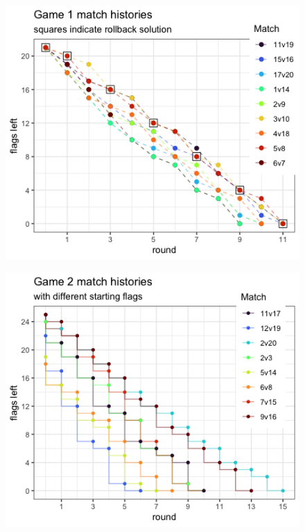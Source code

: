 \documentclass[addpoints, answers]{exam}
\begin{document}
\begin{questions}
\begin{figure}[!h]
  \centering
  \includegraphics[width=.6\linewidth]{figures/Game1.png} 
\end{figure}

\begin{figure}[!h]
  \centering
  \includegraphics[width=.6\linewidth]{figures/Game2.png} 
\end{figure}



\end{questions}
\end{document}
